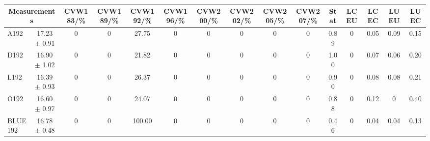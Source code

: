 \begin{table}[H]
\scriptsize
\begin{center}
\renewcommand{\arraystretch}{1.1}
\begin{tabular}{|lc|c|c|c|c|c|c|c|c|ccccc|}
\hline
\multicolumn{2}{|c|}{Measurements} & CVW{\tiny 183}/\%  & CVW{\tiny 189}/\%  & CVW{\tiny 192}/\%  & CVW{\tiny 196}/\%  & CVW{\tiny 200}/\%  & CVW{\tiny 202}/\%  & CVW{\tiny 205}/\%  & CVW{\tiny 207}/\%  & {\tiny Stat} & {\tiny LCEU} & {\tiny LCEC} & {\tiny LUEU} & {\tiny LUEC}\\
\hline
A192 &      17.23 $\pm$       0.91 &  0 &  0 &      27.75 &  0 &  0 &  0 &  0 &  0 &       0.89 &  0 &       0.05 &       0.09 &       0.15\\
D192 &      16.90 $\pm$       1.02 &  0 &  0 &      21.82 &  0 &  0 &  0 &  0 &  0 &       1.00 &  0 &       0.07 &       0.06 &       0.20\\
L192 &      16.39 $\pm$       0.93 &  0 &  0 &      26.37 &  0 &  0 &  0 &  0 &  0 &       0.90 &  0 &       0.08 &       0.08 &       0.21\\
O192 &      16.60 $\pm$       0.97 &  0 &  0 &      24.07 &  0 &  0 &  0 &  0 &  0 &       0.88 &  0 &       0.12 &  0 &       0.40\\
\hline
BLUE {\tiny 192} &      16.78 $\pm$       0.48 &  0 &  0 &     100.00 &  0 &  0 &  0 &  0 &  0 &       0.46 &  0 &       0.04 &       0.04 &       0.13\\
\hline
\end{tabular}
\renewcommand{\arraystretch}{1}
\end{center}
\end{table}
\vspace*{-0.5cm}
